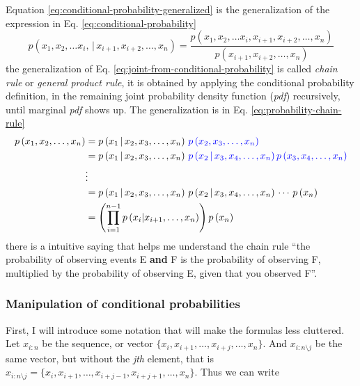 \documentclass[12pt]{article}
\newcommand{\given}{\,|\,} %
\newcommand{\parentheses}[1]{\left(#1\right)}
\newcommand{\pr}[1]{p\parentheses{#1}}
\newcommand{\blue}[1]{\color{blue}#1\color{black}}
\begin{document}
Equation \ref{eq:conditional-probability-generalized} is the generalization of the expression in Eq. \ref{eq:conditional-probability}
\begin{equation}
    p(x_1, x_2, \dots x_i, \given x_{i+1}, x_{i+2}, \dots, x_n) = \dfrac{p(x_1, x_2, \dots x_i, x_{i+1}, x_{i+2}, \dots, x_n)}{p(x_{i+1}, x_{i+2}, \dots, x_n)}
    \label{eq:conditional-probability-generalized}
\end{equation}
the generalization of Eq. \ref{eq:joint-from-conditional-probability} is called \textit{chain rule} or \textit{general product rule}, it is obtained by applying the conditional probability definition, in the remaining joint probability density function (\textit{pdf}) recursively, until marginal \textit{pdf} shows up. The generalization is in Eq. \ref{eq:probability-chain-rule}
\begin{equation}
    \begin{aligned}
        \pr{x_1, x_2, \dots, x_n} &= \pr{x_1 \given x_2, x_3, \dots, x_n} \, \blue{ \pr{x_2, x_3, \dots, x_n} } \\
        &= \pr{x_1 \given x_2, x_3, \dots, x_n} \, \blue{ \pr{x_2 \given x_3, x_4, \dots, x_n} \pr{x_3, x_4, \dots, x_n}} \\
        &\vdots\\
        &= \pr{x_1 \given x_2, x_3, \dots, x_n} \, \pr{x_2 \given x_3, x_4, \dots, x_n} \, \cdots \, \pr{x_n} \\
        &= \left(\prod_{i = 1}^{n-1} \pr{x_i | x_{i+1}, \dots, x_{n}} \right) \pr{x_n}
    \end{aligned}
    \label{eq:probability-chain-rule}
\end{equation}
there is a intuitive saying that helps me understand the chain rule ``the probability of observing events E \textbf{and} F is the probability of observing F, multiplied by the probability of observing E, given that you observed F''.

\subsubsection{Manipulation of conditional probabilities}
First, I will introduce some notation that will make the formulas less cluttered. Let $x_{i:n}$ be the sequence, or vector $\{ x_{i}, x_{i+1}, \dots, x_{i+j}, \dots, x_n\}$. And $x_{i:n \setminus j}$ be the same vector, but without the \textit{jth} element, that is $x_{i:n \setminus j} = \{x_i, x_{i+1}, \dots, x_{i+j-1}, x_{i+j+1}, \dots, x_n\}$. 
Thus we can write 
\end{document}
